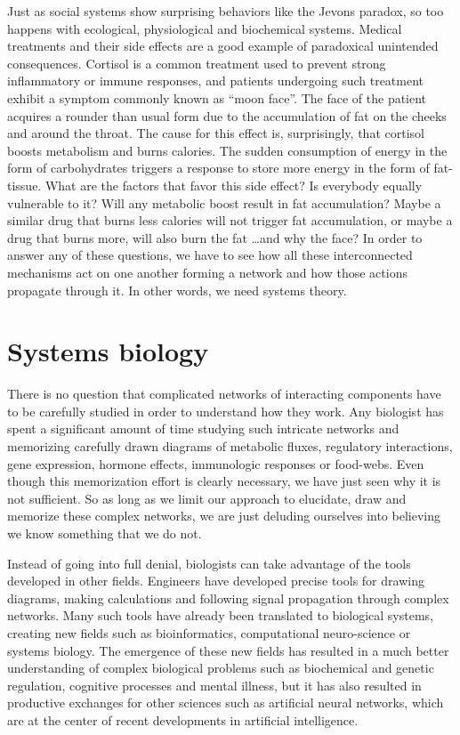 Just as social systems show surprising behaviors like the Jevons paradox, so too happens with ecological, physiological and biochemical systems. Medical treatments and their side effects are a good example of paradoxical  unintended consequences. Cortisol is a common treatment used to prevent strong inflammatory or immune responses, and patients undergoing such treatment exhibit a symptom commonly known as ``moon face''. The face of the patient acquires a rounder than usual form due to the accumulation of fat on the cheeks and around the throat. The cause for this effect is, surprisingly, that cortisol boosts metabolism and burns calories. The sudden consumption of energy in the form of carbohydrates triggers a response to store more energy in the form of fat-tissue. What are the factors that favor this side effect? Is everybody equally vulnerable to it? Will any metabolic boost result in fat accumulation? Maybe a similar drug that burns less calories will not trigger fat accumulation, or maybe a drug that burns more, will also burn the fat \dots  and why the face?  In order to answer any of these questions, we have to see how all these interconnected mechanisms act on one another forming a network and how those actions propagate through it. In other words, we need systems theory.


\section{Systems biology}

There is no question that complicated networks of interacting components have to be carefully studied in order to understand how they work. Any biologist has spent a significant amount of time studying such intricate networks and memorizing carefully drawn diagrams of metabolic fluxes, regulatory interactions, gene expression, hormone effects, immunologic responses or food-webs. Even though this memorization effort is clearly necessary, we have just seen why it is not sufficient. So as long as we limit our approach to elucidate, draw and memorize these complex networks, we are just deluding ourselves into  believing we know something that we do not.

Instead of going into full denial, biologists can take advantage of the tools developed in other fields. Engineers have developed precise tools for drawing diagrams, making calculations and following signal propagation through complex networks. Many such tools have already been translated to biological systems, creating new fields such as bioinformatics, computational neuro-science or systems biology. The emergence of these new fields has resulted in a much better understanding of complex biological problems such as biochemical and genetic regulation, cognitive processes and mental illness, but it has also resulted in productive exchanges for other sciences such as artificial neural networks, which are at the center of recent developments in artificial intelligence.

